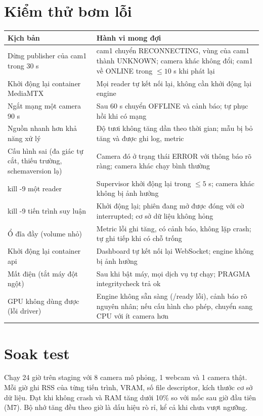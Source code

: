 \documentclass[10pt,a4paper,oneside,openany]{report}
\newcommand{\breakus}{\textunderscore\allowbreak}
\newcommand{\code}[1]{{\ttfamily\let\_\breakus #1}}
\newcommand{\tabhead}[1]{\textsf{\bfseries\color{ink}#1}}
\newenvironment{bang}{\par\small\rowcolors{2}{rowgray}{white}}{\par\vspace{0.3em}}
\begin{document}
\section{Kiểm thử bơm lỗi}\label{sec:bomloi}
\begin{bang}
\begin{xltabular}{\linewidth}{L{44mm}Y}
\toprule
\tabhead{Kịch bản} & \tabhead{Hành vi mong đợi} \\
\midrule
\endhead
Dừng publisher của cam1 trong 30 s & cam1 chuyển \code{RECONNECTING}, vùng của cam1 thành \code{UNKNOWN}; camera khác không đổi; cam1 về \code{ONLINE} trong $\le 10$ s khi phát lại \\
Khởi động lại container MediaMTX & Mọi reader tự kết nối lại, không cần khởi động lại engine \\
Ngắt mạng một camera 90 s & Sau 60 s chuyển \code{OFFLINE} và cảnh báo; tự phục hồi khi có mạng \\
Nguồn nhanh hơn khả năng xử lý & Độ tươi không tăng dần theo thời gian; mẫu bị bỏ tăng và được ghi log, metric \\
Cấu hình sai (đa giác tự cắt, thiếu trường, \code{schema\_version} lạ) & Camera đó ở trạng thái \code{ERROR} với thông báo rõ ràng; camera khác chạy bình thường \\
\code{kill -9} một reader & Supervisor khởi động lại trong $\le 5$ s; camera khác không bị ảnh hưởng \\
\code{kill -9} tiến trình suy luận & Khởi động lại; phiên đang mở được đóng với cờ \code{interrupted}; cơ sở dữ liệu không hỏng \\
Ổ đĩa đầy (volume nhỏ) & Metric lỗi ghi tăng, có cảnh báo, không lặp crash; tự ghi tiếp khi có chỗ trống \\
Khởi động lại container api & Dashboard tự kết nối lại WebSocket; engine không bị ảnh hưởng \\
Mất điện (tắt máy đột ngột) & Sau khi bật máy, mọi dịch vụ tự chạy; \code{PRAGMA integrity\_check} trả \code{ok} \\
GPU không dùng được (lỗi driver) & Engine không sẵn sàng (\code{/ready} lỗi), cảnh báo rõ nguyên nhân; nếu cấu hình cho phép, chuyển sang CPU với ít camera hơn \\
\bottomrule
\end{xltabular}
\end{bang}

\section{Soak test}
Chạy 24 giờ trên staging với 8 camera mô phỏng, 1 webcam và 1 camera thật. Mỗi giờ ghi RSS của từng tiến trình, VRAM, số file descriptor,
kích thước cơ sở dữ liệu. Đạt khi không crash và RAM tăng dưới 10\% so với mốc sau giờ đầu tiên (M7). Bộ nhớ tăng đều theo giờ là dấu hiệu
rò rỉ, kể cả khi chưa vượt ngưỡng.
\end{document}
